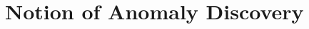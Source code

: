 \documentclass[9pt,journal]{IEEEtran}
\begin{document}
{\section{Notion of Anomaly Discovery}
   

}



              



\end{document}
